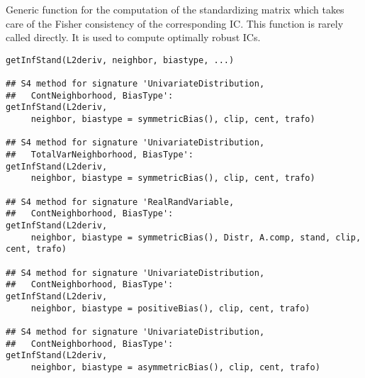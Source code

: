 \begin{Description}\relax
Generic function for the computation of the standardizing matrix which
takes care of the Fisher consistency of the corresponding IC. This function 
is rarely called directly. It is used to compute optimally robust ICs.
\end{Description}
\begin{Usage}
\begin{verbatim}
getInfStand(L2deriv, neighbor, biastype, ...)

## S4 method for signature 'UnivariateDistribution,
##   ContNeighborhood, BiasType':
getInfStand(L2deriv, 
     neighbor, biastype = symmetricBias(), clip, cent, trafo)

## S4 method for signature 'UnivariateDistribution,
##   TotalVarNeighborhood, BiasType':
getInfStand(L2deriv, 
     neighbor, biastype = symmetricBias(), clip, cent, trafo)

## S4 method for signature 'RealRandVariable,
##   ContNeighborhood, BiasType':
getInfStand(L2deriv, 
     neighbor, biastype = symmetricBias(), Distr, A.comp, stand, clip, cent, trafo)

## S4 method for signature 'UnivariateDistribution,
##   ContNeighborhood, BiasType':
getInfStand(L2deriv, 
     neighbor, biastype = positiveBias(), clip, cent, trafo)

## S4 method for signature 'UnivariateDistribution,
##   ContNeighborhood, BiasType':
getInfStand(L2deriv, 
     neighbor, biastype = asymmetricBias(), clip, cent, trafo)
\end{verbatim}
\end{Usage}
